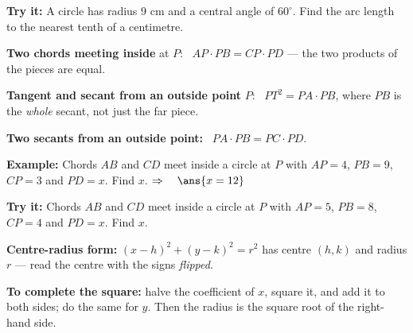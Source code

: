 \documentclass[12pt]{article}
\begin{document}
\begin{tryitbox}
\textbf{Try it:} A circle has radius 9 cm and a central angle of $60^\circ$. Find the
arc length to the nearest tenth of a centimetre.\\[2pt]
\end{tryitbox}


\begin{formulabox}
\textbf{Two chords meeting inside} at $P$: \ $AP \cdot PB = CP \cdot PD$ --- the two
products of the pieces are equal.\par
\textbf{Tangent and secant from an outside point} $P$: \ $PT^2 = PA \cdot PB$, where
$PB$ is the \emph{whole} secant, not just the far piece.\par
\textbf{Two secants from an outside point:} \ $PA \cdot PB = PC \cdot PD$.
\end{formulabox}

\begin{examplebox}
\textbf{Example:} Chords $AB$ and $CD$ meet inside a circle at $P$ with $AP = 4$,
$PB = 9$, $CP = 3$ and $PD = x$. Find $x$.
$\Rightarrow\quad \ans{x = 12}$
\end{examplebox}

\begin{tryitbox}
\textbf{Try it:} Chords $AB$ and $CD$ meet inside a circle at $P$ with $AP = 5$,
$PB = 8$, $CP = 4$ and $PD = x$. Find $x$.\\[2pt]
\end{tryitbox}


\begin{formulabox}
\textbf{Centre-radius form:} $(x-h)^2 + (y-k)^2 = r^2$ has centre $(h,k)$ and radius $r$
--- read the centre with the signs \emph{flipped}.\par
\textbf{To complete the square:} halve the coefficient of $x$, square it, and add it to
both sides; do the same for $y$. Then the radius is the square root of the right-hand side.
\end{formulabox}
\end{document}
